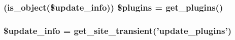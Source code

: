 \hypertarget{update_8php_acc9acb4ba121a45f67dcbe11d7d24062}{
\subsubsection[{\$plugins}]{ (is\_\-object(\$update\_\-info)) \$plugins = get\_\-plugins()}}
\label{d9/da8/update_8php_acc9acb4ba121a45f67dcbe11d7d24062}
\hypertarget{update_8php_ae119c8eda43eaef6fbe36934db8fdbcb}{
\subsubsection[{\$update\_\-info}]{\setlength{\rightskip}{0pt plus 5cm}\$update\_\-info = get\_\-site\_\-transient('update\_\-plugins')}}
\label{d9/da8/update_8php_ae119c8eda43eaef6fbe36934db8fdbcb}
